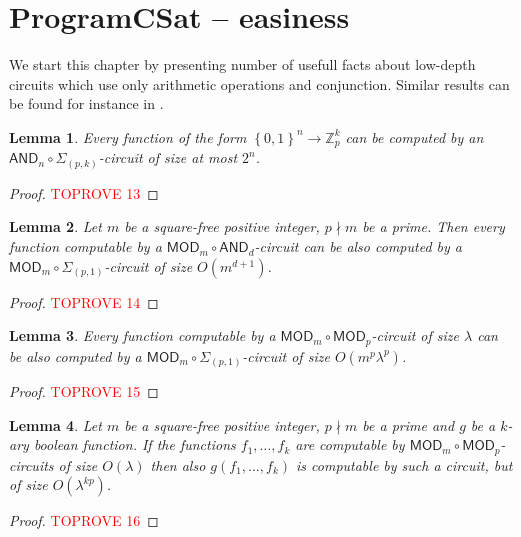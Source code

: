 \documentclass[11pt,a4paper]{amsart}
\newtheorem{lm}{Lemma}[section]
\newcommand{\set}[1]{{\left\{ {#1} \right\} }}
\newcommand{\map}{\longrightarrow}
\newcommand{\z}{\mathbb{Z}}
\newcommand{\sumpk}[2]{\Sigma_{(#1,#2)}}
\newcommand{\csize}{\lambda}
\newcommand{\ccand}{\mathsf{AND}}
\newcommand{\ccmod}{\mathsf{MOD}}
\begin{document}
\section{ProgramCSat -- easiness}
\label{section:easy}



We start this chapter by presenting number of usefull facts about low-depth circuits  which use only arithmetic operations and conjunction. Similar results can be found for instance in \cite{Grolmusz01, GrolmuszT00}.



\begin{lm}\label{lm:and-sum}
Every function of the form $\set{0,1}^n \map \z_p^k$
can be computed by an $\ccand_n\circ\sumpk{p}{k}$-circuit of size at most $2^n$.
\end{lm}

\begin{proof}\textcolor{red}{TOPROVE 13}\end{proof}

\begin{lm}\label{lm:normal-form}
Let $m$ be a square-free positive integer, $p\nmid m$ be a prime.
Then every function computable by a $\ccmod_m\circ\ccand_d$-circuit
can be also computed by a $\ccmod_m\circ\sumpk{p}{1}$-circuit of size $O(m^{d+1})$.
\end{lm}
\begin{proof}\textcolor{red}{TOPROVE 14}\end{proof}


\begin{lm}
\label{lm:unmod}
Every function computable by a $\ccmod_m\circ\ccmod_p$-circuit of size $\csize$
can be also computed by a $\ccmod_m\circ\sumpk{p}{1}$-circuit of size $O(m^p\csize^p)$.
\end{lm}
\begin{proof}\textcolor{red}{TOPROVE 15}\end{proof}


\begin{lm}\label{lm:apply_func}
Let $m$ be a square-free positive integer, $p\nmid m$ be a prime and $g$ be a $k$-ary boolean function.
If the functions $f_1, \ldots, f_k$ are computable by
$\ccmod_m\circ\ccmod_p$-circuits
of size $O(\lambda)$
then also $g(f_1,\ldots,f_k)$ is computable by such a circuit,
but of size $O(\lambda^{kp})$.
\end{lm}
\begin{proof}\textcolor{red}{TOPROVE 16}\end{proof}
\end{document}
